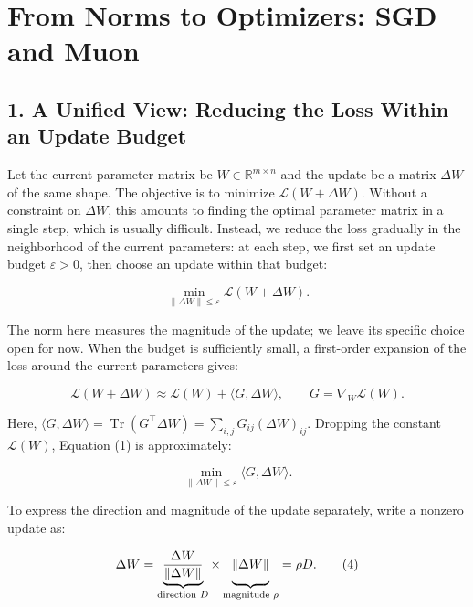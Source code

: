 \documentclass[
  english,
  10pt,
  a4paper,
]{article}
\author{}
\date{}
\begin{document}
\section{From Norms to Optimizers: SGD and
Muon}\label{from-norms-to-optimizers-sgd-and-muon}

\subsection{1. A Unified View: Reducing the Loss Within an Update
Budget}\label{a-unified-view-reducing-the-loss-within-an-update-budget}

Let the current parameter matrix be \(W\in\mathbb R^{m\times n}\) and
the update be a matrix \(\Delta W\) of the same shape. The objective is
to minimize \(\mathcal L(W+\Delta W)\). Without a constraint on
\(\Delta W\), this amounts to finding the optimal parameter matrix in a
single step, which is usually difficult. Instead, we reduce the loss
gradually in the neighborhood of the current parameters: at each step,
we first set an update budget \(\varepsilon>0\), then choose an update
within that budget:

\nopagebreak[4]

\[
\min_{\|\Delta W\|\leq\varepsilon}\mathcal L(W+\Delta W).
\tag{1}
\]

The norm here measures the magnitude of the update; we leave its
specific choice open for now. When the budget is sufficiently small, a
first-order expansion of the loss around the current parameters gives:

\nopagebreak[4]

\[
\mathcal L(W+\Delta W)\approx\mathcal L(W)+\langle G,\Delta W\rangle,
\qquad G=\nabla_W\mathcal L(W).
\tag{2}
\]

Here,
\(\langle G,\Delta W\rangle=\operatorname{Tr}(G^\top\Delta W)=\sum_{i,j}G_{ij}(\Delta W)_{ij}\).
Dropping the constant \(\mathcal L(W)\), Equation (1) is approximately:

\nopagebreak[4]

\[
\min_{\|\Delta W\|\leq\varepsilon}\langle G,\Delta W\rangle.
\tag{3}
\]

To express the direction and magnitude of the update separately, write a
nonzero update as:

\nopagebreak[4]

\[
\Delta W
=\underbrace{\dfrac{\Delta W}{\|\Delta W\|}}_{\text{direction }D}
\times\underbrace{\vphantom{\dfrac{\Delta W}{\|\Delta W\|}}\|\Delta W\|}_{\text{magnitude }\rho}
=\rho D.
\tag{4}
\]
\end{document}
